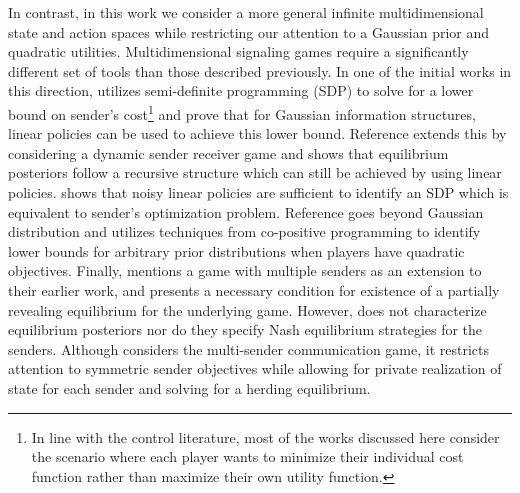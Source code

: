 \documentclass[12pt,journal,onecolumn]{IEEEtran}
\newcommand{\rknote}[1]{\noindent{\leavevmode\color{red}[Raj -- #1]}}
\begin{document}
In contrast, in this work we consider a more general infinite multidimensional state and action spaces while restricting our attention to a Gaussian prior and quadratic utilities. Multidimensional signaling games require a significantly different set of tools than those described previously. In one of the initial works in this direction, \cite{tamura2018bayesian} utilizes semi-definite programming (SDP) to solve for a lower bound on sender's cost\footnote{In line with the control literature, most of the works discussed here consider the scenario where each player wants to minimize their individual cost function rather than maximize their own utility function.} and prove that for Gaussian information structures, linear policies can be used to achieve this lower bound. Reference \cite{sayin2019hierarchical} extends this by considering a dynamic sender receiver game and shows that equilibrium posteriors follow a recursive structure which can still be achieved by using linear policies. \cite{9222530} shows that noisy linear policies are sufficient to identify an SDP which is equivalent to sender's optimization problem. Reference \cite{sayin2021bayesian} goes beyond Gaussian distribution and utilizes techniques from co-positive programming to identify lower bounds for arbitrary prior distributions when players have quadratic objectives. Finally, \cite{tamura2018bayesian} mentions a game with multiple senders as an extension to their earlier work, and  presents a necessary condition for existence of a partially revealing equilibrium for the underlying game. However, \cite{tamura2018bayesian} does not characterize equilibrium posteriors nor do they specify Nash equilibrium strategies for the senders. Although \cite{farokhi2016estimation} considers the multi-sender communication game, it restricts attention to symmetric sender objectives while allowing for private realization of state for each sender and solving for a herding equilibrium. %


\end{document}
